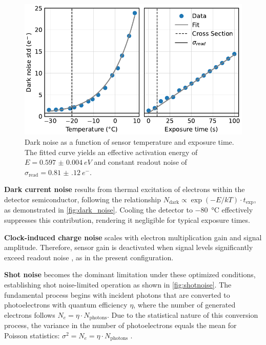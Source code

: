 \documentclass[
	parskip=half,
	a4paper,
]{scrarticle}
\begin{document}
\begin{figure}
    \centering
    \includegraphics{../analysis/figures/dark_noise.pdf}
    \caption{Dark noise as a function of sensor temperature and exposure time. The fitted curve yields an effective activation energy of $E = \SI{0.597(4)}{eV}$ and constant readout noise of $\sigma_{\text{read}} = \SI{0.81(12)}{e^-}$.}
    \label{fig:dark_noise}
\end{figure}

\textbf{Dark current noise} results from thermal excitation of electrons within the detector semiconductor, following the relationship $N_\text{dark} \propto \exp(-E / kT) \cdot t_\text{exp}$, as demonstrated in \autoref{fig:dark_noise}. Cooling the detector to \SI{-80}{\degreeCelsius} effectively suppresses this contribution, rendering it negligible for typical exposure times.

\textbf{Clock-induced charge noise} scales with electron multiplication gain and signal amplitude. Therefore, sensor gain is deactivated when signal levels significantly exceed readout noise \cite{andor_establishing_nodate}, as in the present configuration.

\textbf{Shot noise} becomes the dominant limitation under these optimized conditions, establishing shot noise-limited operation as shown in \autoref{fig:shotnoise}. The fundamental process begins with incident photons that are converted to photoelectrons with quantum efficiency $\eta$, where the number of generated electrons follows $N_e = \eta \cdot N_{\text{photons}}$. Due to the statistical nature of this conversion process, the variance in the number of photoelectrons equals the mean for Poisson statistics: $\sigma^2 = N_e = \eta \cdot N_{\text{photons}}$ \cite{european_machine_vision_association_standard_2010}.
\end{document}
